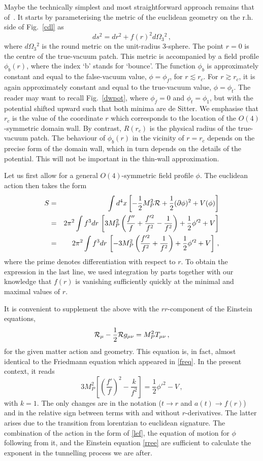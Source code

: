 \documentclass[12pt]{article}
\newcommand{\be}{\begin{equation}}
\newcommand{\ee}{\end{equation}}
\newcommand{\bea}{\begin{eqnarray}}
\newcommand{\eea}{\end{eqnarray}}
\numberwithin{equation}{section}
\begin{document}
Maybe the technically simplest and most straightforward approach remains that of~\cite{Coleman:1980aw}. It starts by parameterising the metric of the euclidean geometry on the r.h. side of Fig.~\ref{cdl} as
\be
ds^2=dr^2+f(r)^2 d\Omega_3{}\!^2\,,
\ee
where $d\Omega_3{}\!^2$ is the round metric on the unit-radius 3-sphere. The point $r=0$ is the centre of the true-vacuum patch. This metric is accompanied by a field profile $\phi_b(r)$, where the index `b' stands for `bounce'. The function $\phi_b$ is approximately constant and equal to the false-vacuum value, $\phi=\phi_f$, for $r\lesssim r_c$. For $r\gtrsim r_c$, it is again approximately constant and equal to the true-vacuum value, $\phi=\phi_t$. The reader may want to recall Fig.~\ref{dwpot}, where $\phi_f=0$ and $\phi_t=\phi_1$, but with the potential shifted upward such that both minima are de Sitter. We emphasise that $r_c$ is the value of the coordinate $r$ which corresponds to the location of the $O(4)$-symmetric domain wall. By contrast, $R(r_c)$ is the physical radius of the true-vacuum patch. The behaviour of $\phi_b(r)$ in the vicinity of $r=r_c$ depends on the precise form of the domain wall, which in turn depends on the details of the potential. This will not be important in the thin-wall approximation.

Let us first allow for a general $O(4)$-symmetric field profile $\phi$. The euclidean action then takes the form
\bea
S&=&\int d^4x\left[-\frac{1}{2}M_P^2{\cal R}+\frac{1}{2}(\partial \phi)^2+V(\phi)\right]
\nonumber \\
&=&2\pi^2\int f^3 dr\,\left[3M_P^2\left(\frac{f''}{f}+\frac{f'^2}{f^2}-\frac{1}{f^2}\right)+\frac{1}{2}\phi'^2+V\right]
\nonumber \\
&=&2\pi^2\int f^3 dr\,\left[-3M_P^2\left(\frac{f'^2}{f^2}+\frac{1}{f^2}\right)+\frac{1}{2}\phi'^2+V\right]\,,\label{lef}
\eea
where the prime denotes differentiation with respect to $r$. 
To obtain the expression in the last line, we used integration by parts together with our knowledge that $f(r)$ is vanishing sufficiently quickly at the minimal and maximal values of $r$. 

It is convenient to supplement the above with the $rr$-component of the Einstein equations,
\be
{\cal R}_{\mu}-\frac{1}{2}{\cal R}g_{\mu\nu}=M_P^2T_{\mu\nu}\,,
\ee
for the given matter action and geometry. This equation is, in fact, almost identical to the Friedmann equation which appeared in \eqref{freq}. In the present context, it reads
\be
3M_P^2\left[\left(\frac{f'}{f}\right)^2-\frac{k}{f^2}
\right]=\frac{1}{2}\phi'^2-V\,,\label{rree}
\ee
with $k=1$. The only changes are in the notation ($t\to r$ and $a(t)\to f(r)$) and in the relative sign between terms with and without $r$-derivatives. The latter arises due to the transition from lorentzian to euclidean signature. The combination of the action in the form of \eqref{lef}, the equation of motion for $\phi$ following from it, and the Einstein equation \eqref{rree} are sufficient to calculate the exponent in the tunnelling process we are after. 
\end{document}
